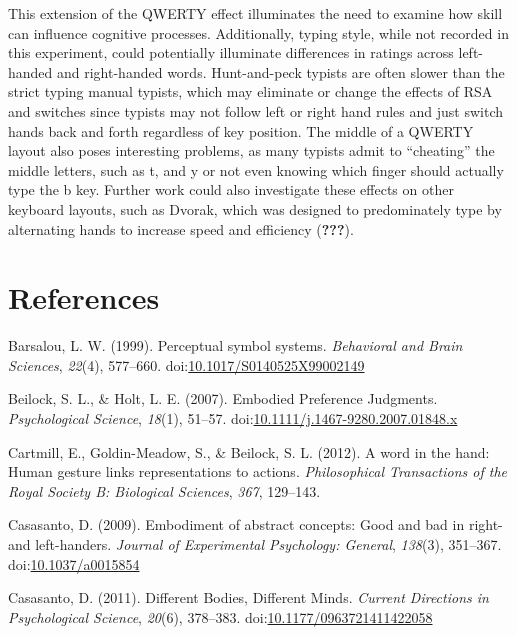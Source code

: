 \documentclass[english,man]{apa6}
\theoremstyle{definition}
\theoremstyle{definition}
\theoremstyle{definition}
\theoremstyle{remark}
\begin{document}
This extension of the QWERTY effect illuminates the need to examine how
skill can influence cognitive processes. Additionally, typing style,
while not recorded in this experiment, could potentially illuminate
differences in ratings across left-handed and right-handed words.
Hunt-and-peck typists are often slower than the strict typing manual
typists, which may eliminate or change the effects of RSA and switches
since typists may not follow left or right hand rules and just switch
hands back and forth regardless of key position. The middle of a QWERTY
layout also poses interesting problems, as many typists admit to
\enquote{cheating} the middle letters, such as t, and y or not even
knowing which finger should actually type the b key. Further work could
also investigate these effects on other keyboard layouts, such as
Dvorak, which was designed to predominately type by alternating hands to
increase speed and efficiency ({\textbf{???}}).

\newpage

\section{References}\label{references}

\setlength{\parindent}{-0.5in} \setlength{\leftskip}{0.5in}

\hypertarget{refs}{}
\hypertarget{ref-Barsalou1999}{}
Barsalou, L. W. (1999). Perceptual symbol systems. \emph{Behavioral and
Brain Sciences}, \emph{22}(4), 577--660.
doi:\href{https://doi.org/10.1017/S0140525X99002149}{10.1017/S0140525X99002149}

\hypertarget{ref-Beilock2007}{}
Beilock, S. L., \& Holt, L. E. (2007). Embodied Preference Judgments.
\emph{Psychological Science}, \emph{18}(1), 51--57.
doi:\href{https://doi.org/10.1111/j.1467-9280.2007.01848.x}{10.1111/j.1467-9280.2007.01848.x}

\hypertarget{ref-Cartmill2012}{}
Cartmill, E., Goldin-Meadow, S., \& Beilock, S. L. (2012). A word in the
hand: Human gesture links representations to actions.
\emph{Philosophical Transactions of the Royal Society B: Biological
Sciences}, \emph{367}, 129--143.

\hypertarget{ref-Casasanto2009}{}
Casasanto, D. (2009). Embodiment of abstract concepts: Good and bad in
right- and left-handers. \emph{Journal of Experimental Psychology:
General}, \emph{138}(3), 351--367.
doi:\href{https://doi.org/10.1037/a0015854}{10.1037/a0015854}

\hypertarget{ref-Casasanto2011}{}
Casasanto, D. (2011). Different Bodies, Different Minds. \emph{Current
Directions in Psychological Science}, \emph{20}(6), 378--383.
doi:\href{https://doi.org/10.1177/0963721411422058}{10.1177/0963721411422058}
\end{document}
